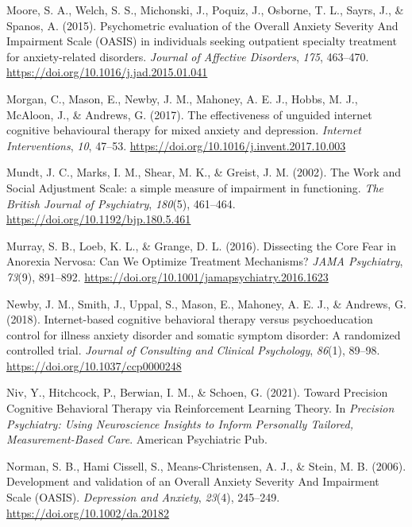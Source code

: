 \documentclass[
  man,floatsintext]{apa7}
\newlength{\cslhangindent}
\newlength{\cslentryspacingunit} %
\newenvironment{CSLReferences}[2] %
 {%
  \setlength{\parindent}{0pt}
  \ifodd #1
  \let\oldpar\par
  \def\par{\hangindent=\cslhangindent\oldpar}
  \fi
  \setlength{\parskip}{#2\cslentryspacingunit}
 }%
 {}
\begin{document}
\begin{CSLReferences}{1}{0}
\leavevmode{}%
Moore, S. A., Welch, S. S., Michonski, J., Poquiz, J., Osborne, T. L., Sayrs, J., \& Spanos, A. (2015). Psychometric evaluation of the Overall Anxiety Severity And Impairment Scale (OASIS) in individuals seeking outpatient specialty treatment for anxiety-related disorders. \emph{Journal of Affective Disorders}, \emph{175}, 463--470. \url{https://doi.org/10.1016/j.jad.2015.01.041}

\leavevmode{}%
Morgan, C., Mason, E., Newby, J. M., Mahoney, A. E. J., Hobbs, M. J., McAloon, J., \& Andrews, G. (2017). The effectiveness of unguided internet cognitive behavioural therapy for mixed anxiety and depression. \emph{Internet Interventions}, \emph{10}, 47--53. \url{https://doi.org/10.1016/j.invent.2017.10.003}

\leavevmode{}%
Mundt, J. C., Marks, I. M., Shear, M. K., \& Greist, J. M. (2002). The Work and Social Adjustment Scale: a simple measure of impairment in functioning. \emph{The British Journal of Psychiatry}, \emph{180}(5), 461--464. \url{https://doi.org/10.1192/bjp.180.5.461}

\leavevmode{}%
Murray, S. B., Loeb, K. L., \& Grange, D. L. (2016). Dissecting the Core Fear in Anorexia Nervosa: Can We Optimize Treatment Mechanisms? \emph{JAMA Psychiatry}, \emph{73}(9), 891--892. \url{https://doi.org/10.1001/jamapsychiatry.2016.1623}

\leavevmode{}%
Newby, J. M., Smith, J., Uppal, S., Mason, E., Mahoney, A. E. J., \& Andrews, G. (2018). Internet-based cognitive behavioral therapy versus psychoeducation control for illness anxiety disorder and somatic symptom disorder: A randomized controlled trial. \emph{Journal of Consulting and Clinical Psychology}, \emph{86}(1), 89--98. \url{https://doi.org/10.1037/ccp0000248}

\leavevmode{}%
Niv, Y., Hitchcock, P., Berwian, I. M., \& Schoen, G. (2021). Toward Precision Cognitive Behavioral Therapy via Reinforcement Learning Theory. In \emph{Precision Psychiatry: Using Neuroscience Insights to Inform Personally Tailored, Measurement-Based Care}. American Psychiatric Pub.

\leavevmode{}%
Norman, S. B., Hami Cissell, S., Means-Christensen, A. J., \& Stein, M. B. (2006). Development and validation of an Overall Anxiety Severity And Impairment Scale (OASIS). \emph{Depression and Anxiety}, \emph{23}(4), 245--249. \url{https://doi.org/10.1002/da.20182}


\end{CSLReferences}
\end{document}
